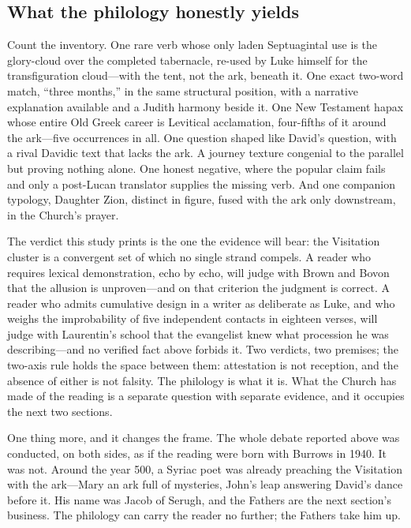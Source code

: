 \subsection{What the philology honestly yields}

Count the inventory. One rare verb whose only laden Septuagintal use is
the glory-cloud over the completed tabernacle, re-used by Luke himself for
the transfiguration cloud---with the tent, not the ark, beneath it. One
exact two-word match, ``three months,'' in the same structural position,
with a narrative explanation available and a Judith harmony beside it. One
New Testament hapax whose entire Old Greek career is Levitical acclamation,
four-fifths of it around the ark---five occurrences in all. One question
shaped like David's question, with a rival Davidic text that lacks the
ark. A journey texture congenial to the parallel but proving nothing
alone. One honest negative, where the popular claim fails and only a
post-Lucan translator supplies the missing verb. And one companion
typology, Daughter Zion, distinct in figure, fused with the ark only
downstream, in the Church's prayer.

The verdict this study prints is the one the evidence will bear: the
Visitation cluster is a convergent set of which no single strand compels.
A reader who requires lexical demonstration, echo by echo, will judge with
Brown and Bovon that the allusion is unproven---and on that criterion the
judgment is correct. A reader who admits cumulative design in a writer as
deliberate as Luke, and who weighs the improbability of five independent
contacts in eighteen verses, will judge with Laurentin's school that the
evangelist knew what procession he was describing---and no verified fact
above forbids it. Two verdicts, two premises; the two-axis rule
holds the space between them: attestation is not reception, and the
absence of either is not falsity. The philology is what it is. What
the Church has made of the reading is a separate question with separate
evidence, and it occupies the next two sections.

One thing more, and it changes the frame. The whole debate reported above
was conducted, on both sides, as if the reading were born with Burrows in
1940. It was not. Around the year 500, a Syriac poet was already preaching
the Visitation with the ark---Mary an ark full of mysteries, John's leap
answering David's dance before it. His name was Jacob of Serugh, and the
Fathers are the next section's business. The philology can carry the
reader no further; the Fathers take him up.
